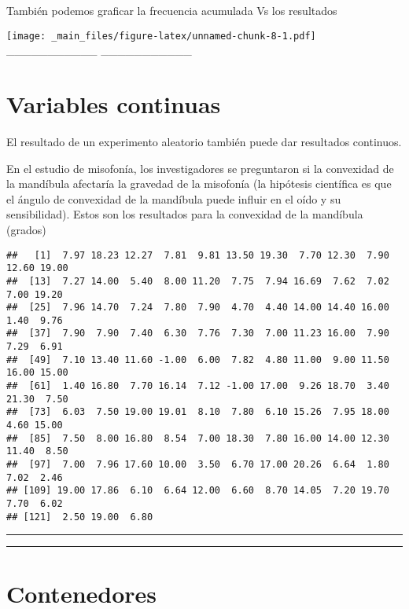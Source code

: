 \documentclass[
]{book}
\begin{document}
También podemos graficar la frecuencia acumulada Vs los resultados

\texttt{[image: \_main\_files/figure-latex/unnamed-chunk-8-1.pdf]}
\_\_\_\_\_\_\_\_\_\_\_
\_\_\_\_\_\_\_\_\_\_\_

\hypertarget{variables-continuas}{%
\section{Variables continuas}\label{variables-continuas}}

El resultado de un experimento aleatorio también puede dar resultados continuos.

En el estudio de misofonía, los investigadores se preguntaron si la convexidad de la mandíbula afectaría la gravedad de la misofonía (la hipótesis científica es que el ángulo de convexidad de la mandíbula puede influir en el oído y su sensibilidad). Estos son los resultados para la convexidad de la mandíbula (grados)

\begin{verbatim}
##   [1]  7.97 18.23 12.27  7.81  9.81 13.50 19.30  7.70 12.30  7.90 12.60 19.00
##  [13]  7.27 14.00  5.40  8.00 11.20  7.75  7.94 16.69  7.62  7.02  7.00 19.20
##  [25]  7.96 14.70  7.24  7.80  7.90  4.70  4.40 14.00 14.40 16.00  1.40  9.76
##  [37]  7.90  7.90  7.40  6.30  7.76  7.30  7.00 11.23 16.00  7.90  7.29  6.91
##  [49]  7.10 13.40 11.60 -1.00  6.00  7.82  4.80 11.00  9.00 11.50 16.00 15.00
##  [61]  1.40 16.80  7.70 16.14  7.12 -1.00 17.00  9.26 18.70  3.40 21.30  7.50
##  [73]  6.03  7.50 19.00 19.01  8.10  7.80  6.10 15.26  7.95 18.00  4.60 15.00
##  [85]  7.50  8.00 16.80  8.54  7.00 18.30  7.80 16.00 14.00 12.30 11.40  8.50
##  [97]  7.00  7.96 17.60 10.00  3.50  6.70 17.00 20.26  6.64  1.80  7.02  2.46
## [109] 19.00 17.86  6.10  6.64 12.00  6.60  8.70 14.05  7.20 19.70  7.70  6.02
## [121]  2.50 19.00  6.80
\end{verbatim}

\begin{center}\rule{0.5\linewidth}{0.5pt}\end{center}

\begin{center}\rule{0.5\linewidth}{0.5pt}\end{center}

\hypertarget{contenedores}{%
\section{Contenedores}\label{contenedores}}
\end{document}

